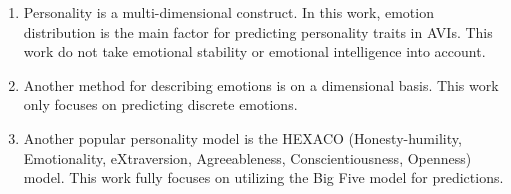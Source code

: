 \begin{enumerate}
    \item Personality is a multi-dimensional construct. In this work, emotion distribution is the main factor for predicting personality traits in AVIs. This work do not take emotional stability or emotional intelligence into account. \\
    \item Another method for describing emotions is on a dimensional basis. This work only focuses on predicting discrete emotions.   \\
    \item  Another popular personality model is the HEXACO (Honesty-humility, Emotionality, eXtraversion, Agreeableness, Conscientiousness, Openness) model. This work fully focuses on utilizing the Big Five model for predictions.
\end{enumerate}

       
